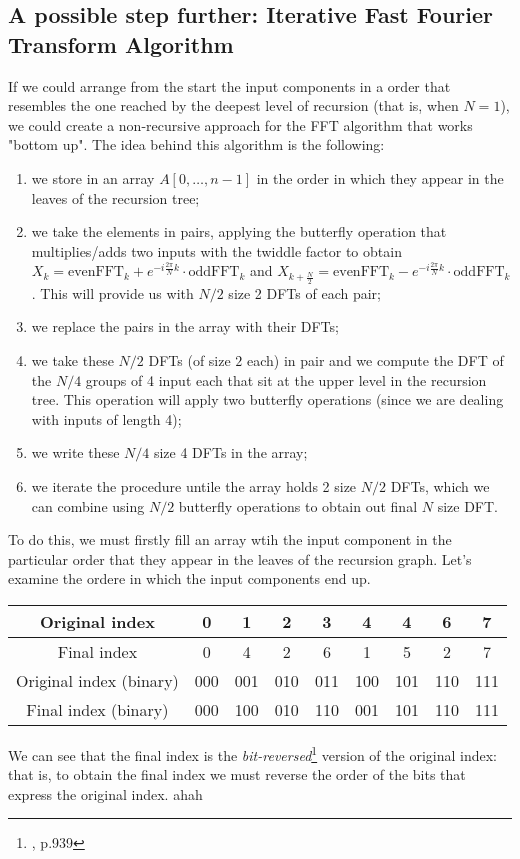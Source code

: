 \documentclass[class=article,crop=false]{standalone}
\begin{document}
\subsection{A possible step further: Iterative Fast Fourier Transform Algorithm}
If we could arrange from the start the input components in a order that resembles the one reached by the deepest level of recursion (that is, when $N=1$), we could create a non-recursive approach for the FFT algorithm that works "bottom up". The idea behind this algorithm is the following:
\begin{enumerate}
\item we store in an array $A[0,\ldots,n-1]$ in the order in which they appear in the leaves of the recursion tree;
\item we take the elements in pairs, applying the butterfly operation that multiplies/adds two inputs with the twiddle factor to obtain $X_k=\text{evenFFT}_k+e^{-i\frac{2\pi}{N}k}\cdot \text{oddFFT}_k$ and $X_{k+\frac{N}{2}}=\text{evenFFT}_k-e^{-i\frac{2\pi}{N}k}\cdot \text{oddFFT}_k$. This will provide us with $N/2$ size 2 DFTs of each pair;
\item we replace the pairs in the array with their DFTs;
\item we take these $N/2$ DFTs (of size $2$ each) in pair and we compute the DFT of the $N/4$ groups of 4 input each that sit at the upper level in the recursion tree. This operation will apply two butterfly operations (since we are dealing with inputs of length 4);
\item we write these $N/4$ size 4 DFTs in the array;
\item we iterate the procedure untile the array holds 2 size $N/2$ DFTs, which we can combine using $N/2$ butterfly operations to obtain out final $N$ size DFT.
\end{enumerate}
To do this, we must firstly fill an array wtih the input component in the particular order that they appear in the leaves of the recursion graph. Let's examine the ordere in which the input components end up.\begin{center}
\begin{tabular}{|c| c c c c c c c c|}
    \hline
Original index &0 &1 &2 &3 &4 &4 &6 &7\\
\hline
Final index &0 &4 &2 &6 &1 &5 &2 &7\\
\hline
Original index (binary) &000 &001 &010 &011 &100 &101 &110 &111\\
\hline
Final index (binary) &000 &100 &010 &110 &001 &101 &110 &111\\
\hline
\end{tabular}\end{center}
We can see that the final index is the \textit{bit-reversed}\footnote{\cite{introalgo}, p.939} version of the original index: that is, to obtain the final index we must reverse the order of the bits that express the original index.
ahah
\end{document}
